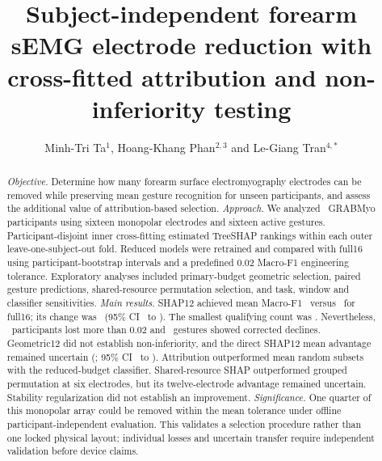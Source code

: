 \documentclass{iopjournal}
\begin{document}
\title{Subject-independent forearm sEMG electrode reduction with cross-fitted attribution and non-inferiority testing}
\author{Minh-Tri Ta$^1$, Hoang-Khang Phan$^{2,3}$ and Le-Giang Tran$^{4,*}$}







\begin{abstract}
\textit{Objective.} Determine how many forearm surface electromyography electrodes can be removed while preserving mean gesture recognition for unseen participants, and assess the additional value of attribution-based selection.
\textit{Approach.} We analyzed \GRABMyoParticipants\ GRABMyo participants using sixteen monopolar electrodes and sixteen active gestures. Participant-disjoint inner cross-fitting estimated TreeSHAP rankings within each outer leave-one-subject-out fold. Reduced models were retrained and compared with full16 using participant-bootstrap intervals and a predefined 0.02 Macro-F1 engineering tolerance. Exploratory analyses included primary-budget geometric selection, paired gesture predictions, shared-resource permutation selection, and task, window and classifier sensitivities.
\textit{Main results.} SHAP12 achieved mean Macro-F1 \RevShapMean\ versus \RevPrimaryFull\ for full16; its change was \RevShapDelta\ (95\% CI \RevShapLow\ to \RevShapHigh). The smallest qualifying count was \KStarMarginPtTwo. Nevertheless, \RevLossCount\ participants lost more than 0.02 and \RevGestureLossCount\ gestures showed corrected declines. Geometric12 did not establish non-inferiority, and the direct SHAP12 mean advantage remained uncertain (\RevGeomContrast; 95\% CI \RevGeomContrastLow\ to \RevGeomContrastHigh). Attribution outperformed mean random subsets with the reduced-budget classifier. Shared-resource SHAP outperformed grouped permutation at six electrodes, but its twelve-electrode advantage remained uncertain. Stability regularization did not establish an improvement.
\textit{Significance.} One quarter of this monopolar array could be removed within the mean tolerance under offline participant-independent evaluation. This validates a selection procedure rather than one locked physical layout; individual losses and uncertain transfer require independent validation before device claims.
\end{abstract}
\end{document}
